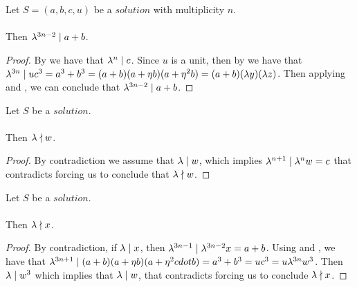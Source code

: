 \begin{lemma}
    \label{lmm:lambda_pow_dvd_a_add_b}
    \leanok
    Let $S=(a, b, c, u)$ be a $solution$ with multiplicity $n$.\\\\
    Then $\lambda^{3n -2} \mid a + b$.
\end{lemma}
\begin{proof}
    \leanok
    By  we have that $\lambda^n \mid c$.
    Since $u$ is a unit, then by  we have that
    $\lambda^{3n} \mid u  c^3 = a^3 + b^3 = (a+b)  (a + \eta  b)  (a + \eta^2  b)
    = (a+b)(\lambda y)(\lambda z)$.
    Then applying  and , we can conclude
    that $\lambda^{3n-2} \mid a+b$.
\end{proof}

\begin{lemma}
    \label{lmm:lambda_not_dvd_w}
    \leanok
    Let $S$ be a $solution$.\\\\
    Then $\lambda \nmid w$.
\end{lemma}
\begin{proof}
    \leanok
    By contradiction we assume that $\lambda \mid w$, which implies
    $\lambda^{n+1} \mid \lambda^n  w = c$ that contradicts 
    forcing us to conclude that $\lambda \nmid w$.
\end{proof}

\begin{lemma}
    \label{lmm:lambda_not_dvd_x}
    \leanok
    Let $S$ be a $solution$.\\\\
    Then $\lambda \nmid x$.
\end{lemma}
\begin{proof}
    \leanok
    By contradiction, if $\lambda \mid x$, then
    $\lambda^{3n-1} \mid \lambda^{3n-2}  x = a+b$. Using 
    and , we have that $\lambda^{3n+1} \mid
    (a+b)  (a + \eta  b)  (a + \eta^2 cdot b) = a^3+b^3
    = u c^3 = u \lambda^{3n} w^3$.
    Then $\lambda \mid w^3$ which implies that $\lambda \mid w$, that
    contradicts  forcing us to conclude $\lambda \nmid x$.
\end{proof}


